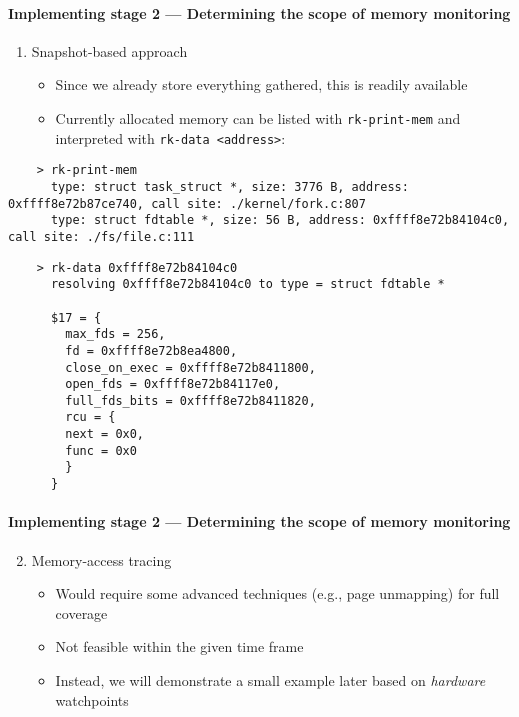 \documentclass{i20lecture}
\begin{document}
\begin{frame}[fragile]{\insertsection}
  \framesubtitle{Implementing stage 2 --- Determining the scope of memory monitoring}

    \begin{enumerate}
     \item Snapshot-based approach
\pause
     \begin{itemize}
      \item Since we already store everything gathered, this is readily available
\pause
      \item Currently allocated memory can be listed with \lstinline|rk-print-mem| and interpreted with \lstinline|rk-data <address>|:
     \end{itemize}
    \end{enumerate}
    \begin{lstlisting}
    > rk-print-mem
	  type: struct task_struct *, size: 3776 B, address: 0xffff8e72b87ce740, call site: ./kernel/fork.c:807
	  type: struct fdtable *, size: 56 B, address: 0xffff8e72b84104c0, call site: ./fs/file.c:111
    \end{lstlisting}
    \begin{lstlisting}
	> rk-data 0xffff8e72b84104c0
	  resolving 0xffff8e72b84104c0 to type = struct fdtable *

	  $17 = {
	    max_fds = 256,
	    fd = 0xffff8e72b8ea4800,
	    close_on_exec = 0xffff8e72b8411800,
	    open_fds = 0xffff8e72b84117e0,
	    full_fds_bits = 0xffff8e72b8411820,
	    rcu = {
	  	next = 0x0,
	  	func = 0x0
	    }
	  }
    \end{lstlisting}
\end{frame}

\begin{frame}[fragile]{\insertsection}
  \framesubtitle{Implementing stage 2 --- Determining the scope of memory monitoring}

    \begin{enumerate}
     \setcounter{enumi}{1}
     \item Memory-access tracing
\pause
    \begin{itemize}
     \item Would require some advanced techniques (e.g., page unmapping) for full coverage
\pause
    \item Not feasible within the given time frame
\pause
    \item Instead, we will demonstrate a small example later based on \textit{hardware} watchpoints
    \end{itemize}
    \end{enumerate}
\end{frame}
\end{document}
